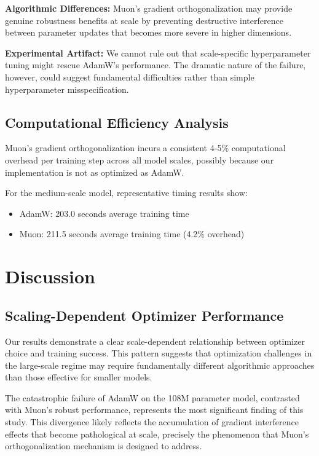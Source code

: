 \documentclass[11pt,a4paper]{article}
\begin{document}
\textbf{Algorithmic Differences:} Muon's gradient orthogonalization may provide genuine robustness benefits at scale by preventing destructive interference between parameter updates that becomes more severe in higher dimensions.

\textbf{Experimental Artifact:} We cannot rule out that scale-specific hyperparameter tuning might rescue AdamW's performance. The dramatic nature of the failure, however, could suggest fundamental difficulties rather than simple hyperparameter misspecification.

\subsection{Computational Efficiency Analysis}

Muon's gradient orthogonalization incurs a consistent 4-5\% computational overhead per training step across all model scales, possibly because our implementation is not as optimized as AdamW.

For the medium-scale model, representative timing results show:
\begin{itemize}[leftmargin=*]
    \item AdamW: 203.0 seconds average training time
    \item Muon: 211.5 seconds average training time (4.2\% overhead)
\end{itemize}

\section{Discussion}

\subsection{Scaling-Dependent Optimizer Performance}

Our results demonstrate a clear scale-dependent relationship between optimizer choice and training success. This pattern suggests that optimization challenges in the large-scale regime may require fundamentally different algorithmic approaches than those effective for smaller models.

The catastrophic failure of AdamW on the 108M parameter model, contrasted with Muon's robust performance, represents the most significant finding of this study. This divergence likely reflects the accumulation of gradient interference effects that become pathological at scale, precisely the phenomenon that Muon's orthogonalization mechanism is designed to address.
\end{document}
